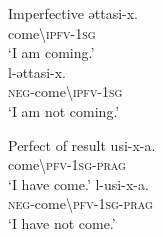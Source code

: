 \documentclass[output=paper,colorlinks,citecolor=brown]{langscibook}
\begin{document}
%
%
%

\ea\label{ex:siw:2} Imperfective
    \ea
        \gll əttasi-x. \\
            come{\textbackslash}\textsc{ipfv-1sg} \\
        \glt ‘I am coming.’ \\
    \ex
        \gll l-əttasi-x. \\ 
             \textsc{neg}{}-come{\textbackslash}\textsc{ipfv-1sg}\\
        \glt ‘I am not coming.’
    \z
\z

\ea\label{ex:siw:3} Perfect of result 
    \ea
        \gll usi-x-a. \\
            come{\textbackslash}\textsc{pfv-1sg-prag}  \\ 
        \glt ‘I have come.’
    \ex 
        \gll l-usi-x-a.\\
         \textsc{neg-}come{\textbackslash}\textsc{pfv-1sg-prag}\\
        \glt ‘I have not come.’
    \z
\z
\end{document}
